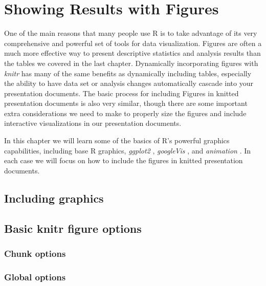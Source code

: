 



\chapter{Showing Results with Figures}\label{FiguresChapter}

One of the main reasons that many people use R is to take advantage of its very comprehensive and powerful set of tools for data visualization. Figures are often a much more effective way to present descriptive statistics and analysis results than the tables we covered in the last chapter. Dynamically incorporating figures with \emph{knitr} has many of the same benefits as dynamically including tables, especially the ability to have data set or analysis changes automatically cascade into your presentation documents. The basic process for including Figures in knitted presentation documents is also very similar, though there are some important extra considerations we need to make to properly size the figures and include interactive visualizations in our presentation documents.

In this chapter we will learn some of the basics of R's powerful graphics capabilities, including base R graphics, \emph{ggplot2} \citep{R-ggplot2}, \emph{googleVis} \citep{R-googleVis}, and \emph{animation} \citep{R-animation}. In each case we will focus on how to include the figures in knitted presentation documents. 

\section{Including graphics}

\section{Basic knitr figure options}

\subsection{Chunk options}

\subsection{Global options}

